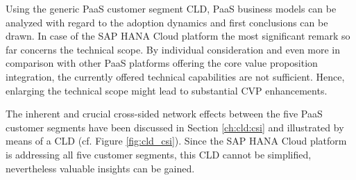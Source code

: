 Using the generic \ac{PaaS} customer segment \ac{CLD}, \ac{PaaS} business models can be analyzed with regard to the adoption dynamics and first conclusions can be drawn. In case of the SAP HANA Cloud platform the most significant remark so far concerns the technical scope. By individual consideration and even more in comparison with other \ac{PaaS} platforms offering the core value proposition integration, the currently offered technical capabilities are not sufficient. Hence, enlarging the technical scope might lead to substantial \ac{CVP} enhancements.

The inherent and crucial cross-sided network effects between the five \ac{PaaS} customer segments have been discussed in Section \ref{ch:cld:csi} and illustrated by means of a \ac{CLD} (cf. Figure \ref{fig:cld_csi}). Since the SAP HANA Cloud platform is addressing all five customer segments, this \ac{CLD} cannot be simplified, nevertheless valuable insights can be gained.

